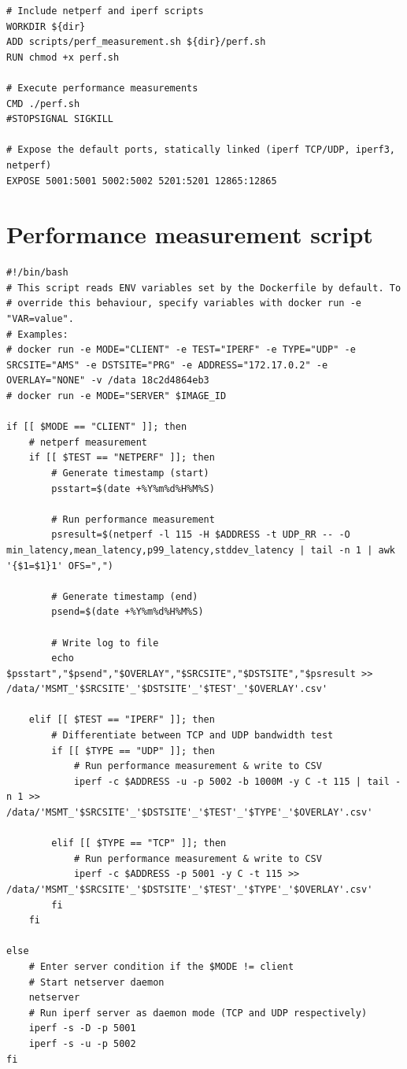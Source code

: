 \begin{appendices}
\begin{lstlisting}
# Include netperf and iperf scripts
WORKDIR ${dir}
ADD scripts/perf_measurement.sh ${dir}/perf.sh
RUN chmod +x perf.sh

# Execute performance measurements
CMD ./perf.sh
#STOPSIGNAL SIGKILL

# Expose the default ports, statically linked (iperf TCP/UDP, iperf3, netperf)
EXPOSE 5001:5001 5002:5002 5201:5201 12865:12865
\end{lstlisting}
\newpage

\section{ Performance measurement script} \label{app:script}
\begin{lstlisting}
#!/bin/bash
# This script reads ENV variables set by the Dockerfile by default. To 
# override this behaviour, specify variables with docker run -e "VAR=value".
# Examples:
# docker run -e MODE="CLIENT" -e TEST="IPERF" -e TYPE="UDP" -e SRCSITE="AMS" -e DSTSITE="PRG" -e ADDRESS="172.17.0.2" -e OVERLAY="NONE" -v /data 18c2d4864eb3
# docker run -e MODE="SERVER" $IMAGE_ID

if [[ $MODE == "CLIENT" ]]; then
	# netperf measurement
	if [[ $TEST == "NETPERF" ]]; then
		# Generate timestamp (start)
		psstart=$(date +%Y%m%d%H%M%S)

		# Run performance measurement
		psresult=$(netperf -l 115 -H $ADDRESS -t UDP_RR -- -O min_latency,mean_latency,p99_latency,stddev_latency | tail -n 1 | awk '{$1=$1}1' OFS=",")

		# Generate timestamp (end)
		psend=$(date +%Y%m%d%H%M%S)

		# Write log to file
		echo $psstart","$psend","$OVERLAY","$SRCSITE","$DSTSITE","$psresult >> /data/'MSMT_'$SRCSITE'_'$DSTSITE'_'$TEST'_'$OVERLAY'.csv'

	elif [[ $TEST == "IPERF" ]]; then
		# Differentiate between TCP and UDP bandwidth test
		if [[ $TYPE == "UDP" ]]; then
			# Run performance measurement & write to CSV
			iperf -c $ADDRESS -u -p 5002 -b 1000M -y C -t 115 | tail -n 1 >> /data/'MSMT_'$SRCSITE'_'$DSTSITE'_'$TEST'_'$TYPE'_'$OVERLAY'.csv'

		elif [[ $TYPE == "TCP" ]]; then
			# Run performance measurement & write to CSV
			iperf -c $ADDRESS -p 5001 -y C -t 115 >> /data/'MSMT_'$SRCSITE'_'$DSTSITE'_'$TEST'_'$TYPE'_'$OVERLAY'.csv'
		fi
	fi

else
    # Enter server condition if the $MODE != client
	# Start netserver daemon
	netserver
	# Run iperf server as daemon mode (TCP and UDP respectively)
	iperf -s -D -p 5001
	iperf -s -u -p 5002
fi


\end{lstlisting}
\end{appendices}
